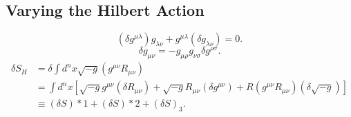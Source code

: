 \documentclass[11pt, a4paper]{report}
\begin{document}
\subsection{Varying the Hilbert Action}
\begin{equation}
(\delta g^{\mu\lambda})g_{\lambda\nu} + g^{\mu\lambda}(\delta g_{\lambda\nu}) = 0.
\end{equation}
\begin{equation}
\label{eq:metric_variation_relation}
\delta g_{\mu\nu} = -g_{\mu\rho}g_{\nu\sigma} \delta g^{\rho\sigma}.
\end{equation}
\begin{align}
\delta S_{H} &= \delta \int d^{n}x \sqrt{-g} (g^{\mu\nu}R_{\mu\nu}) \nonumber \\
&= \int d^{n}x \left[ \sqrt{-g} g^{\mu\nu} (\delta R_{\mu\nu}) + \sqrt{-g} R_{\mu\nu} (\delta g^{\mu\nu}) + R (g^{\mu\nu}R_{\mu\nu}) (\delta\sqrt{-g}) \right] \nonumber \\
&\equiv (\delta S)*{1} + (\delta S)*{2} + (\delta S)_{3}.
\end{align}
\end{document}
